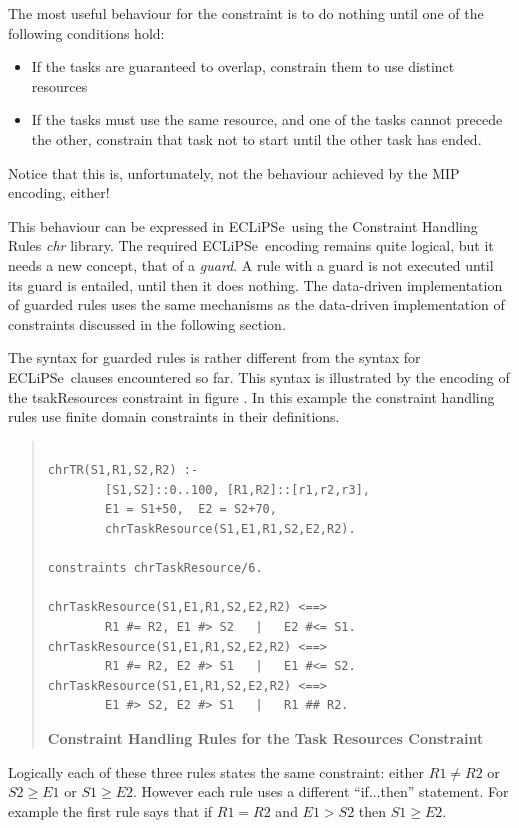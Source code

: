 \documentclass[a4wide]{article}
\newcommand{\ECL}{\mbox{ECLiPSe\ }{\hspace{1mm}}}
\begin{document}
The most useful behaviour for the constraint is to do nothing until
one of the following conditions hold:
\begin{itemize}
\item
If the tasks are guaranteed to overlap, constrain them to use distinct
resources
\item
If the tasks must use the same resource, and one of the tasks cannot
precede the other, constrain that task not to start until the other
task has ended.
\end{itemize}
Notice that this is, unfortunately,  not the behaviour achieved by the
MIP encoding, either!

This behaviour can be expressed in \ECL using the Constraint Handling
Rules {\em chr} library.
The required \ECL encoding remains quite logical, but it needs a new
concept, that of a {\em guard}.
A rule with a guard is not executed until its guard is entailed, until
then it does nothing.
The data-driven implementation of guarded rules uses the same
mechanisms as the
data-driven implementation of constraints discussed in the following
section.

The syntax for guarded rules is rather different from the syntax for
\ECL clauses encountered so far.
This syntax is illustrated by the encoding of the tsakResources
constraint in figure \pageref{chrtaskResources}.
In this example the constraint handling rules use finite domain
constraints in their definitions.

\begin{quote}
\begin{verbatim}

chrTR(S1,R1,S2,R2) :-
        [S1,S2]::0..100, [R1,R2]::[r1,r2,r3],
        E1 = S1+50,  E2 = S2+70,
        chrTaskResource(S1,E1,R1,S2,E2,R2).

constraints chrTaskResource/6.

chrTaskResource(S1,E1,R1,S2,E2,R2) <==> 
        R1 #= R2, E1 #> S2   |   E2 #<= S1.
chrTaskResource(S1,E1,R1,S2,E2,R2) <==> 
        R1 #= R2, E2 #> S1   |   E1 #<= S2.
chrTaskResource(S1,E1,R1,S2,E2,R2) <==> 
        E1 #> S2, E2 #> S1   |   R1 ## R2.
\end{verbatim}
{\bf Constraint Handling Rules for the Task Resources Constraint}
\label{chrtaskResources}
\end{quote} 

Logically each of these three rules states the same constraint: either
$R1 \neq R2$ or $S2 \geq E1$ or $S1 \geq E2$.
However each rule uses a different ``if...then'' statement.
For example the first rule says that if $R1=R2$ and $E1>S2$ then $S1
\geq E2$.
\end{document}
